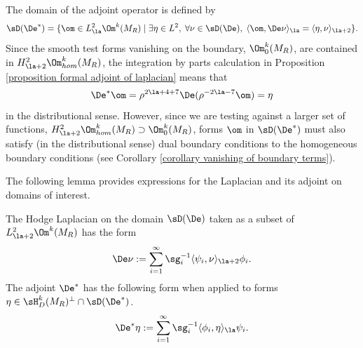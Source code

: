 \documentclass[hidelinks, 12pt, oneside, reqno]{amsart}
\begin{document}
The domain of the adjoint operator is defined by
\[
\sD(\De^*) = \{ \om \in L^2_{\la}\Om^k(M_R) \;|\; \exists \eta \in L^2, \; \forall \nu \in \sD(\De), \; \langle \om, \De \nu \rangle_{\la} = \langle \eta, \nu \rangle_{\la+2} \}.
\]
Since the smooth test forms vanishing on the boundary, $\Om^k_0(M_R)$, are contained in $H^2_{\la+2}\Om^k_{hom}(M_R)$, the integration by parts calculation in Proposition \ref{proposition formal adjoint of laplacian} means that 
\[
\De^* \om = \rho^{2\la + 4 + 7}\De (\rho^{-2\la -7} \om ) = \eta 
\]
in the distributional sense. However, since we are testing against a larger set of functions, $H^2_{\la+2}\Om^k_{hom}(M_R) \supset \Om^k_0(M_R)$, forms $\om$ in $\sD(\De^*)$ must also satisfy (in the distributional sense) dual boundary conditions to the homogeneous boundary conditions (see Corollary \ref{corollary vanishing of boundary terms}). 

The following lemma provides expressions for the Laplacian and its adjoint on domains of interest.  

\begin{lem}\label{lemma SVD for hodge laplacian}
    The Hodge Laplacian on the domain $\sD(\De)$ taken as a subset of $L^{2}_{\la + 2}\Om^k(M_R)$ has the form
    \begin{equation}\label{equation SVD for hodge laplacian}
        \De \nu := \sum_{i=1}^\infty \sg_i^{-1} \langle \psi_i, \nu \rangle_{\la + 2} \phi_i.
    \end{equation}
    The adjoint $\De^*$ has the following form when applied to forms $\eta \in \sH^k_D(M_R)^\perp \cap \sD(\De^*)$.
    \begin{equation}\label{equation SVD for exact adjoint laplacian}
        \De^* \eta := \sum_{i=1}^\infty \sg_i^{-1} \langle \phi_i, \eta \rangle_{\la} \psi_i.
    \end{equation}
\end{lem}
\end{document}

